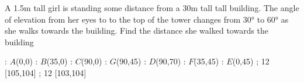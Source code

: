 
%
%
%
%
% 
% 

\question[3] A 1.5m tall girl is standing some distance from a 30m tall tall building.
The angle of elevation from her eyes to to the top of the tower changes from $\ang{30}$
to $\ang{60}$ as she walks towards the building. Find the distance she walked towards the building


\ifprintanswers
  \begin{marginfigure}
      : $A$(0,0)
      : $B$(35,0)
      : $C$(90,0)
      : $G$(90,45)
      : $D$(90,70)
      : $F$(35,45)
      : $E$(0,45)
    \figdrawbegin{}
      \figdrawline [100,101,102,103,105,106,100]
      \figdrawline [101,105,104,106]
      \figdrawline [103,104]
       ; 12 [105,104] 
       ; 12 [103,104] 
    \figdrawend
    \centerline{\box\figBoxA}
  \end{marginfigure}
\fi 

